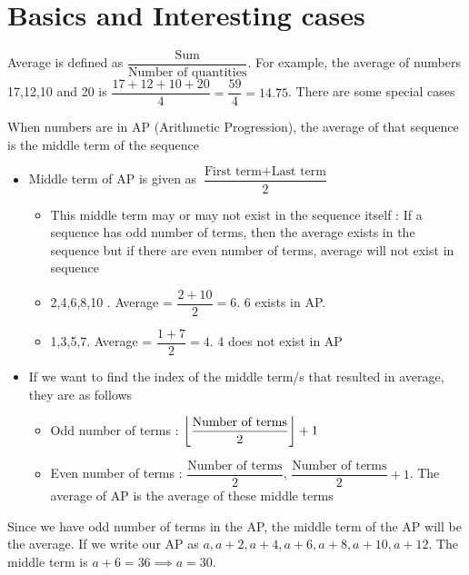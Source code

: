 \section{Basics and Interesting cases}

Average is defined as $\dfrac{\text{Sum}}{\text{Number of quantities}}$. For example, the average of numbers 17,12,10 and 20 is $\dfrac{17 + 12 + 10 + 20}{4} = \dfrac{59}{4} = 14.75$. There are some special cases

When numbers are in AP (Arithmetic Progression), the average of that sequence is the middle term of the sequence

\begin{itemize}
    \item Middle term of AP is given as $\dfrac{\text{First term} + \text{Last term}}{2}$
    \begin{itemize}
        \item This middle term may or may not exist in the sequence itself : If a sequence has odd number of terms, then the average exists in the sequence but if there are even number of terms, average will not exist in sequence
        \item 2,4,6,8,10 . Average = $\dfrac{2 + 10}{2} = 6$. 6 exists in AP. 
        \item 1,3,5,7. Average = $\dfrac{1 + 7}{2} = 4$. 4 does not exist in AP
    \end{itemize}

    \item If we want to find the index of the middle term/s that resulted in average, they are as follows
    \begin{itemize}
        \item Odd number of terms : $\displaystyle{\left \lfloor { \dfrac{\text{Number of terms}}{2} } \right \rfloor} + 1$
        \item Even number of terms : $ \dfrac{\text{Number of terms}}{2} $, $ \dfrac{\text{Number of terms}}{2} + 1$. The average of AP is the average of these middle terms 
    \end{itemize}
\end{itemize}


Since we have odd number of terms in the AP, the middle term of the AP will be the average. If we write our AP as $a , a+2 , a+4 , a+6 , a+8 , a+10 , a+12 $. The middle term is $a + 6 = 36 \implies a = 30$. \\

